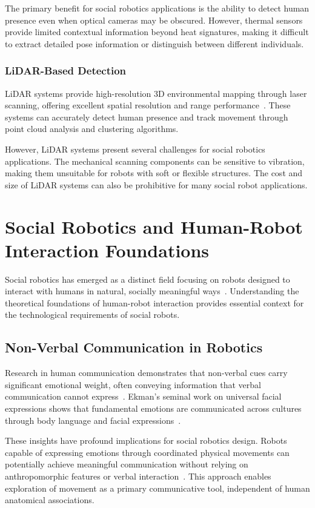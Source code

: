 The primary benefit for social robotics applications is the ability to detect human presence even when optical cameras may be obscured. However, thermal sensors provide limited contextual information beyond heat signatures, making it difficult to extract detailed pose information or distinguish between different individuals.

\subsubsection{LiDAR-Based Detection}
LiDAR systems provide high-resolution 3D environmental mapping through laser scanning, offering excellent spatial resolution and range performance~\cite{yan2019lidar}. These systems can accurately detect human presence and track movement through point cloud analysis and clustering algorithms.

However, LiDAR systems present several challenges for social robotics applications. The mechanical scanning components can be sensitive to vibration, making them unsuitable for robots with soft or flexible structures. The cost and size of LiDAR systems can also be prohibitive for many social robot applications.

\section{Social Robotics and Human-Robot Interaction Foundations}
Social robotics has emerged as a distinct field focusing on robots designed to interact with humans in natural, socially meaningful ways~\cite{breazeal2003toward}. Understanding the theoretical foundations of human-robot interaction provides essential context for the technological requirements of social robots.

\subsection{Non-Verbal Communication in Robotics}
Research in human communication demonstrates that non-verbal cues carry significant emotional weight, often conveying information that verbal communication cannot express~\cite{mehrabian1971silent}. Ekman's seminal work on universal facial expressions shows that fundamental emotions are communicated across cultures through body language and facial expressions~\cite{ekman1971universals}.

These insights have profound implications for social robotics design. Robots capable of expressing emotions through coordinated physical movements can potentially achieve meaningful communication without relying on anthropomorphic features or verbal interaction~\cite{breazeal2003toward}. This approach enables exploration of movement as a primary communicative tool, independent of human anatomical associations.

